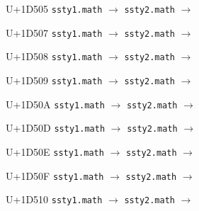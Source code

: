 \documentclass{article}
\begin{document}
\begin{substitutions}
\goodbreak

U+1D505  \linebreak
    \texttt{ssty1.math} $\to$  \linebreak
    \texttt{ssty2.math} $\to$  

\goodbreak

U+1D507  \linebreak
    \texttt{ssty1.math} $\to$  \linebreak
    \texttt{ssty2.math} $\to$  

\goodbreak

U+1D508  \linebreak
    \texttt{ssty1.math} $\to$  \linebreak
    \texttt{ssty2.math} $\to$  

\goodbreak

U+1D509  \linebreak
    \texttt{ssty1.math} $\to$  \linebreak
    \texttt{ssty2.math} $\to$  

\goodbreak

U+1D50A  \linebreak
    \texttt{ssty1.math} $\to$  \linebreak
    \texttt{ssty2.math} $\to$  

\goodbreak

U+1D50D  \linebreak
    \texttt{ssty1.math} $\to$  \linebreak
    \texttt{ssty2.math} $\to$  

\goodbreak

U+1D50E  \linebreak
    \texttt{ssty1.math} $\to$  \linebreak
    \texttt{ssty2.math} $\to$  

\goodbreak

U+1D50F  \linebreak
    \texttt{ssty1.math} $\to$  \linebreak
    \texttt{ssty2.math} $\to$  

\goodbreak

U+1D510  \linebreak
    \texttt{ssty1.math} $\to$  \linebreak
    \texttt{ssty2.math} $\to$  


\end{substitutions}
\end{document}
